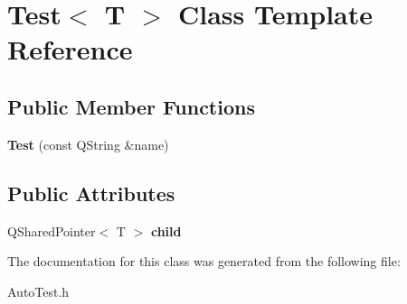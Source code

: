 \hypertarget{class_test}{}\section{Test$<$ T $>$ Class Template Reference}
\label{class_test}
\subsection*{Public Member Functions}
\begin{DoxyCompactItemize}
\item 
\hypertarget{class_test_a744fa6648f5397560c203dc145146787}{}{\bfseries Test} (const Q\+String \&name)\label{class_test_a744fa6648f5397560c203dc145146787}

\end{DoxyCompactItemize}
\subsection*{Public Attributes}
\begin{DoxyCompactItemize}
\item 
\hypertarget{class_test_acfb1db9d3c0e3f372aa716b6ead5a00c}{}Q\+Shared\+Pointer$<$ T $>$ {\bfseries child}\label{class_test_acfb1db9d3c0e3f372aa716b6ead5a00c}

\end{DoxyCompactItemize}


The documentation for this class was generated from the following file\+:\begin{DoxyCompactItemize}
\item 
Auto\+Test.\+h\end{DoxyCompactItemize}
